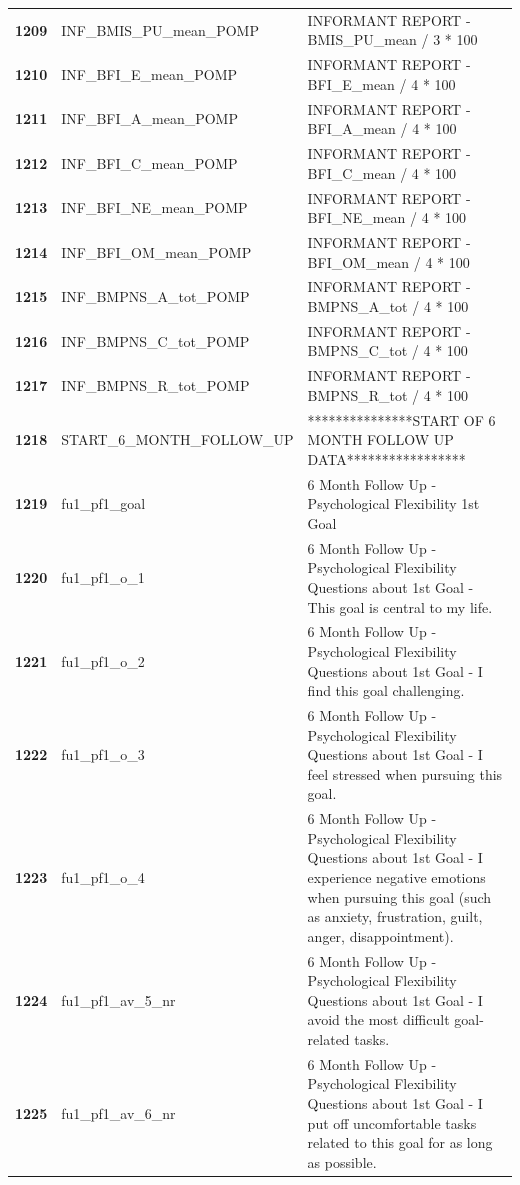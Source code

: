 \documentclass[
  letterpaper,
  DIV=11,
  numbers=noendperiod]{scrartcl}
\begin{document}
\begin{longtable}[t]{>{}cll}
\textbf{1209} & INF\_BMIS\_PU\_mean\_POMP & INFORMANT REPORT - BMIS\_PU\_mean / 3 * 100\\
\textbf{1210} & INF\_BFI\_E\_mean\_POMP & INFORMANT REPORT - BFI\_E\_mean / 4 * 100\\
\addlinespace
\textbf{1211} & INF\_BFI\_A\_mean\_POMP & INFORMANT REPORT - BFI\_A\_mean / 4 * 100\\
\textbf{1212} & INF\_BFI\_C\_mean\_POMP & INFORMANT REPORT - BFI\_C\_mean / 4 * 100\\
\textbf{1213} & INF\_BFI\_NE\_mean\_POMP & INFORMANT REPORT - BFI\_NE\_mean / 4 * 100\\
\textbf{1214} & INF\_BFI\_OM\_mean\_POMP & INFORMANT REPORT - BFI\_OM\_mean / 4 * 100\\
\textbf{1215} & INF\_BMPNS\_A\_tot\_POMP & INFORMANT REPORT - BMPNS\_A\_tot / 4 * 100\\
\addlinespace
\textbf{1216} & INF\_BMPNS\_C\_tot\_POMP & INFORMANT REPORT - BMPNS\_C\_tot / 4 * 100\\
\textbf{1217} & INF\_BMPNS\_R\_tot\_POMP & INFORMANT REPORT - BMPNS\_R\_tot / 4 * 100\\
\textbf{1218} & START\_6\_MONTH\_FOLLOW\_UP & ***************START OF 6 MONTH FOLLOW UP DATA*****************\\
\textbf{1219} & fu1\_pf1\_goal & 6 Month Follow Up - Psychological Flexibility 1st Goal\\
\textbf{1220} & fu1\_pf1\_o\_1 & 6 Month Follow Up - Psychological Flexibility Questions about 1st Goal - This goal is central to my life.\\
\addlinespace
\textbf{1221} & fu1\_pf1\_o\_2 & 6 Month Follow Up - Psychological Flexibility Questions about 1st Goal - I find this goal challenging.\\
\textbf{1222} & fu1\_pf1\_o\_3 & 6 Month Follow Up - Psychological Flexibility Questions about 1st Goal - I feel stressed when pursuing this goal.\\
\textbf{1223} & fu1\_pf1\_o\_4 & 6 Month Follow Up - Psychological Flexibility Questions about 1st Goal - I experience negative emotions when pursuing this goal (such as anxiety, frustration, guilt, anger, disappointment).\\
\textbf{1224} & fu1\_pf1\_av\_5\_nr & 6 Month Follow Up - Psychological Flexibility Questions about 1st Goal - I avoid the most difficult goal-related tasks.\\
\textbf{1225} & fu1\_pf1\_av\_6\_nr & 6 Month Follow Up - Psychological Flexibility Questions about 1st Goal - I put off uncomfortable tasks related to this goal for as long as possible.\\

\end{longtable}
\end{document}
